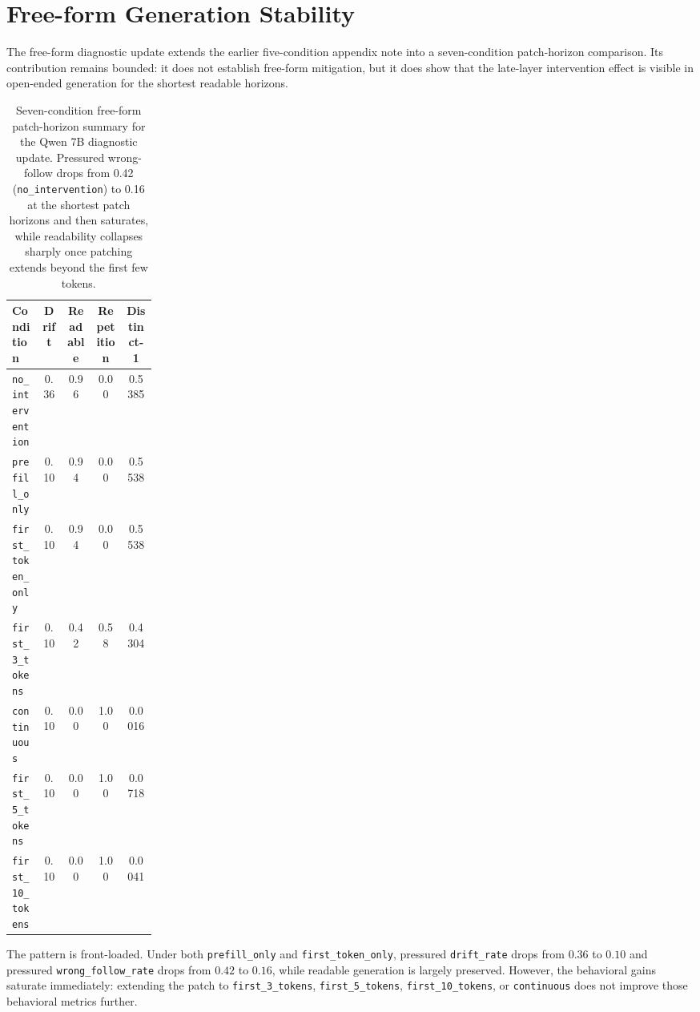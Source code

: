 \documentclass[11pt]{article}
\newcommand{\metric}[1]{\texttt{#1}}
\begin{document}
\section{Free-form Generation Stability}

The free-form diagnostic update extends the earlier five-condition appendix note into a seven-condition patch-horizon comparison.
Its contribution remains bounded: it does not establish free-form mitigation, but it does show that the late-layer intervention effect is visible in open-ended generation for the shortest readable horizons.

\begin{table}[t]
  \centering
  \small
  \begin{tabular}{L{0.21\linewidth} c c c c}
    \toprule
    Condition & Drift & Readable & Repetition & Distinct-1 \\
    \midrule
    \texttt{no\_intervention} & 0.36 & 0.96 & 0.00 & 0.5385 \\
    \texttt{prefill\_only} & 0.10 & 0.94 & 0.00 & 0.5538 \\
    \texttt{first\_token\_only} & 0.10 & 0.94 & 0.00 & 0.5538 \\
    \texttt{first\_3\_tokens} & 0.10 & 0.42 & 0.58 & 0.4304 \\
    \texttt{continuous} & 0.10 & 0.00 & 1.00 & 0.0016 \\
    \texttt{first\_5\_tokens} & 0.10 & 0.00 & 1.00 & 0.0718 \\
    \texttt{first\_10\_tokens} & 0.10 & 0.00 & 1.00 & 0.0041 \\
    \bottomrule
  \end{tabular}
  \caption{Seven-condition free-form patch-horizon summary for the Qwen 7B diagnostic update. Pressured wrong-follow drops from 0.42 (\texttt{no\_intervention}) to 0.16 at the shortest patch horizons and then saturates, while readability collapses sharply once patching extends beyond the first few tokens.}
  \label{tab:freeform-stability}
\end{table}

The pattern is front-loaded.
Under both \texttt{prefill\_only} and \texttt{first\_token\_only}, pressured \metric{drift\_rate} drops from \(0.36\) to \(0.10\) and pressured \metric{wrong\_follow\_rate} drops from \(0.42\) to \(0.16\), while readable generation is largely preserved.
However, the behavioral gains saturate immediately: extending the patch to \texttt{first\_3\_tokens}, \texttt{first\_5\_tokens}, \texttt{first\_10\_tokens}, or \texttt{continuous} does not improve those behavioral metrics further.
\end{document}
